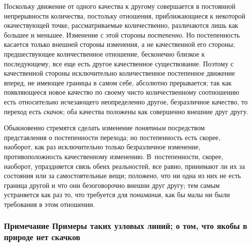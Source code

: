 Поскольку движение от одного качества к другому совершается в постоянной
непрерывности количества, постольку отношения, приближающиеся к некоторой
окачествующей точке, рассматриваемые количественно, различаются лишь как
большее и меньшее. Изменение с этой стороны
{\em постепенно}. Но постепенность касается только
внешней стороны изменения, а не качественной его стороны; предшествующее
количественное отношение, бесконечно близкое к последующему, все еще есть
другое качественное существование. Поэтому с качественной стороны
исключительно количественное постепенное движение вперед, не имеющее
границы в самом себе, абсолютно прерывается; так как появляющееся новое
качество по своему чисто количественному соотношению есть относительно
исчезающего неопределенно другое, безразличное качество, то переход есть
{\em скачок}; оба качества положены как совершенно
внешние друг другу.

Обыкновенно стремятся сделать изменение {\em понятным}
посредством представления о постепенности перехода; но постепенность есть
скорее, наоборот, как раз исключительно только безразличное изменение,
противоположность качественному изменению. В~постепенности, скорее,
наоборот, упраздняется связь обеих реальностей, все равно, принимают ли их
за состояния или за самостоятельные вещи; положено, что ни одна из них не
есть граница другой и что они безоговорочно внешни друг другу; тем самым
устраняется как раз то, что требуется для
{\em понимания}, как бы малы ни были требования в этом
отношении.


\subsubsection[Примечание Примеры таких узловых линий; о том, что якобы в природе нет скачков]
{Примечание Примеры таких узловых линий; о том, что якобы в природе нет скачков}


